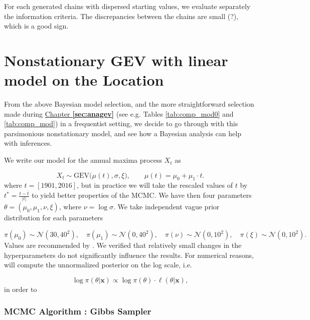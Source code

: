  For each generated chains with dispersed starting values, we evaluate separately the information criteria. The discrepancies between the chains are small (?), which is a good sign. 
 
 

\section{Nonstationary GEV with linear model on the Location}\label{sec:bay_nonsta}


From the above Bayesian model selection, and the more straightforward selection made during \hyperref[sec:anagev]{Chapter \textbf{\ref{sec:anagev}}} (see e.g. Tables \ref{tab:comp_mod0} and \ref{tab:comp_mod}) in a frequentist setting, we decide to go through with this parsimonious nonstationary model, and see how a Bayesian analysis can help with inferences.

We write our model for the annual maxima process $X_t$ as  

\begin{equation*}
X_{t}\sim \text{GEV}\big(\mu(t), \sigma, \xi\big), \qquad \mu(t)= \mu_0+\mu_1\cdot t.
\end{equation*}
where $t=[1901,2016]$, but in practice we will take the rescaled values of $t$ by $t^{*} = \frac{t - \bar{t} }{|t|}$ to yield better properties of the  MCMC. 
We have then four parameters $\theta=(\mu_0,\mu_1,\nu,\xi)$, where $\nu=\log\sigma$. We take independent vague prior distribution for each parameters 

\begin{equation*}
\pi(\mu_0)\sim\mathcal{N}(30,40^2),\quad \pi(\mu_1)\sim\mathcal{N}(0,40^2),\quad \pi(\nu)\sim\mathcal{N}(0,10^2),\quad
\pi(\xi)\sim\mathcal{N}(0,10^2).
\end{equation*}
Values are recommended by \citet[chap.13]{dey_extreme_2016}. We verified that relatively small changes in the hyperparameters do not significantly influence the results.
For numerical reasons, will compute the unnormalized posterior on the log scale, i.e.

\begin{equation}\label{eq:logpost}
\log\pi(\theta|\boldsymbol{x})\propto \log\pi(\theta)\cdot \ell(\theta|\boldsymbol{x}),
\end{equation}
in order to 

\subsubsection*{MCMC Algorithm : Gibbs Sampler}

